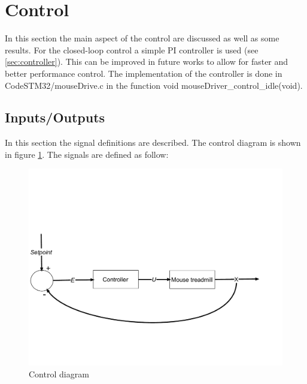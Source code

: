\documentclass[12pt,a4paper, twoside]{article}
\begin{document}
\section{Control} \label{sec:control}
In this section the main aspect of the control are discussed as well as some results.
For the closed-loop control a simple PI controller is used (see \ref{sec:controller}). This can be improved in future works to allow for faster and better performance control. The implementation of the controller is done in CodeSTM32/mouseDrive.c in the function void mouseDriver\_control\_idle(void). 

\subsection{Inputs/Outputs}
In this section the signal definitions are described.
The control diagram is shown in figure \ref{fig:ctrl_diag}. The signals are defined as follow:
\begin{figure}[H]
	\centering
	\includegraphics[width=0.8\linewidth]{fig/ctrl_diag.pdf}
	\caption{Control diagram}\label{fig:ctrl_diag}
\end{figure}
\end{document}
